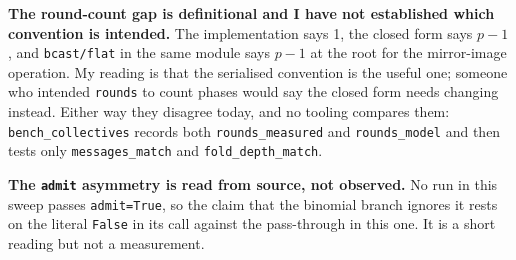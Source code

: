 \documentclass[11pt]{article}
\begin{document}
\textbf{The round-count gap is definitional and I have not established which convention is
intended.} The implementation says 1, the closed form says $p-1$, and \texttt{bcast/flat} in the
same module says $p-1$ at the root for the mirror-image operation. My reading is that the
serialised convention is the useful one; someone who intended \texttt{rounds} to count phases
would say the closed form needs changing instead. Either way they disagree today, and no tooling
compares them: \texttt{bench\_collectives} records both \texttt{rounds\_measured} and
\texttt{rounds\_model} and then tests only \texttt{messages\_match} and
\texttt{fold\_depth\_match}.

\textbf{The \texttt{admit} asymmetry is read from source, not observed.} No run in this sweep
passes \texttt{admit=True}, so the claim that the binomial branch ignores it rests on the literal
\texttt{False} in its call against the pass-through in this one. It is a short reading but not a
measurement.
\end{document}
